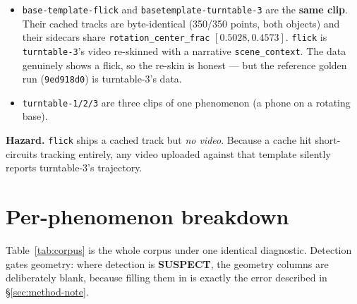 \documentclass[11pt,a4paper]{article}
\newcommand{\susp}{\textcolor{bad}{\textbf{SUSPECT}}}
\begin{document}
\begin{itemize}
  \item \texttt{base-template-flick} and \texttt{basetemplate-turntable-3} are the
  \textbf{same clip}. Their cached tracks are byte-identical (350/350 points, both objects) and
  their sidecars share \texttt{rotation\_center\_frac} $[0.5028,0.4573]$. \texttt{flick} is
  \texttt{turntable-3}'s video re-skinned with a narrative \texttt{scene\_context}. The data
  genuinely shows a flick, so the re-skin is honest --- but the reference golden run
  (\texttt{9ed918d0}) is turntable-3's data.
  \item \texttt{turntable-1/2/3} are three clips of one phenomenon (a phone on a rotating base).
\end{itemize}

\textbf{Hazard.} \texttt{flick} ships a cached track but \emph{no video}. Because a cache hit
short-circuits tracking entirely, any video uploaded against that template silently reports
turntable-3's trajectory.

\section{Per-phenomenon breakdown}

Table~\ref{tab:corpus} is the whole corpus under one identical diagnostic. Detection gates
geometry: where detection is \susp, the geometry columns are deliberately blank, because
filling them in is exactly the error described in \S\ref{sec:method-note}.
\end{document}
